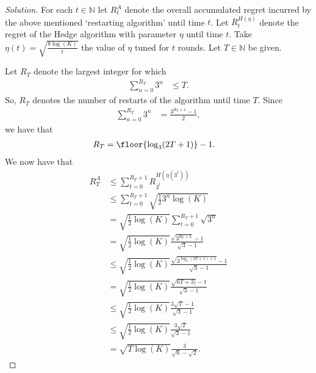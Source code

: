 \documentclass[10pt, a4paper, twoside]{amsart}
\theoremstyle{plain}
\newcommand{\N}{\ensuremath{\mathbb{N}}}
\DeclarePairedDelimiter{\floor}\lfloor\rfloor
\newenvironment{solution}
               {\let\oldqedsymbol=\qedsymbol
                \renewcommand{\qedsymbol}{$\blacktriangleleft$}
                \begin{proof}[Solution]}
               {\end{proof}
                \renewcommand{\qedsymbol}{\oldqedsymbol}}
\begin{document}
\begin{solution}
For each $t \in \N$ let $R^{A}_t$ denote the overall accumulated regret incurred by the above mentioned `restarting algorithm' until time $t$. Let $R^{H(\eta)}_t$ denote the regret of the Hedge algorithm with parameter $\eta$ until time $t$. Take $\eta(t)=\sqrt{\frac{8\log(K)}{t}}$ the value of $\eta$ tuned for $t$ rounds.
Let $T \in \N$ be given.



Let $R_T$ denote the largest integer for which
\begin{align*}
 \sum_{n=0}^{R_T}3^n &\leq T.
\end{align*}
So, $R_T$ denotes the number of restarts of the algorithm until time $T$.
Since
\begin{align*}
 \sum_{n=0}^{R_T}3^n &= \frac{3^{R_T+1}-1}{2},
\end{align*}
we have that
\begin{align*}
 R_T &= \floor{\log_3(2T+1)}-1.
\end{align*}
We now have that
\begin{align*}
 R^{A}_T & \leq \sum_{t=0}^{R_T+1}R^{H(\eta(3^t))}_{3^t} \\
 & \leq \sum_{t=0}^{R_T+1} \sqrt{\tfrac{1}{2}3^n\log(K)} \\
 & = \sqrt{\tfrac{1}{2}\log(K)}\sum_{t=0}^{R_T+1} \sqrt{3^n} \\
 & = \sqrt{\tfrac{1}{2}\log(K)}\frac{\sqrt{3^{R_T+2}}-1}{\sqrt{3}-1} \\
 & \leq \sqrt{\tfrac{1}{2}\log(K)}\frac{\sqrt{3^{\log_3(2T+1)+1}}-1}{\sqrt{3}-1} \\
 & = \sqrt{\tfrac{1}{2}\log(K)}\frac{\sqrt{6T+3)}-1}{\sqrt{3}-1} \\
 & \leq \sqrt{\tfrac{1}{2}\log(K)}\frac{3\sqrt{T}-1}{\sqrt{3}-1} \\
 & \leq \sqrt{\tfrac{1}{2}\log(K)}\frac{3\sqrt{T}}{\sqrt{3}-1} \\
 & = \sqrt{T\log(K)}\frac{3}{\sqrt{6}-\sqrt{2}}.
\end{align*}

\end{solution}
\end{document}
